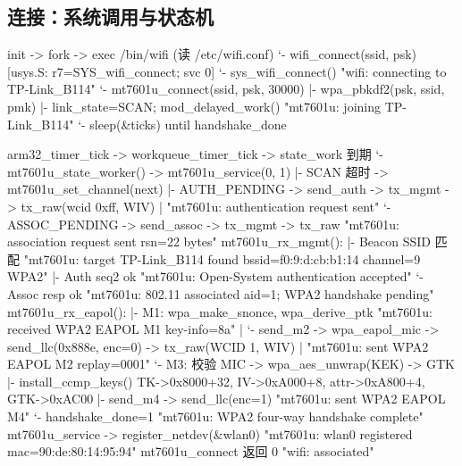 \documentclass[UTF8,zihao=-4,fontset=none]{ctexart}
\begin{document}
\subsection{连接：系统调用与状态机}
\begin{code}
init -> fork -> exec /bin/wifi (读 /etc/wifi.conf)
 `- wifi_connect(ssid, psk)   [usys.S: r7=SYS_wifi_connect; svc 0]
     `- sys_wifi_connect()                          "wifi: connecting to TP-Link_B114"
         `- mt7601u_connect(ssid, psk, 30000)
             |- wpa_pbkdf2(psk, ssid, pmk)
             |- link_state=SCAN; mod_delayed_work()  "mt7601u: joining TP-Link_B114"
             `- sleep(&ticks) until handshake_done

arm32_timer_tick -> workqueue_timer_tick -> state_work 到期
 `- mt7601u_state_worker() -> mt7601u_service(0, 1)
     |- SCAN 超时  -> mt7601u_set_channel(next)
     |- AUTH_PENDING  -> send_auth -> tx_mgmt -> tx_raw(wcid 0xff, WIV)
     |                                   "mt7601u: authentication request sent"
     `- ASSOC_PENDING -> send_assoc -> tx_mgmt -> tx_raw
                                         "mt7601u: association request sent rsn=22 bytes"
mt7601u_rx_mgmt():
 |- Beacon SSID 匹配  "mt7601u: target TP-Link_B114 found bssid=f0:9:d:cb:b1:14 channel=9 WPA2"
 |- Auth seq2 ok      "mt7601u: Open-System authentication accepted"
 `- Assoc resp ok     "mt7601u: 802.11 associated aid=1; WPA2 handshake pending"
mt7601u_rx_eapol():
 |- M1: wpa_make_snonce, wpa_derive_ptk   "mt7601u: received WPA2 EAPOL M1 key-info=8a"
 |   `- send_m2 -> wpa_eapol_mic -> send_llc(0x888e, enc=0) -> tx_raw(WCID 1, WIV)
 |                                         "mt7601u: sent WPA2 EAPOL M2 replay=0001"
 `- M3: 校验 MIC -> wpa_aes_unwrap(KEK) -> GTK
     |- install_ccmp_keys()   TK->0x8000+32, IV->0xA000+8, attr->0xA800+4, GTK->0xAC00
     |- send_m4 -> send_llc(enc=1)          "mt7601u: sent WPA2 EAPOL M4"
     `- handshake_done=1                    "mt7601u: WPA2 four-way handshake complete"
mt7601u_service -> register_netdev(&wlan0)  "mt7601u: wlan0 registered mac=90:de:80:14:95:94"
mt7601u_connect 返回 0                      "wifi: associated"
\end{code}
\end{document}
